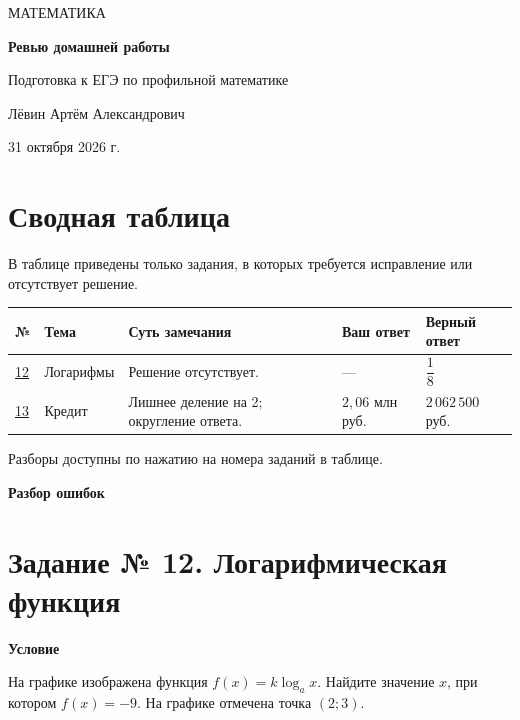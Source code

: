 \documentclass[a4paper,12pt]{article}
\newcommand{\headtxt}[1]{\par\smallskip\textbf{\textcolor{darkaccent}{#1}}\par\vspace{-1mm}}
\begin{document}
\thispagestyle{empty}
\begin{center}
\vspace*{39mm}
{\large\textcolor{darkaccent}{МАТЕМАТИКА}}\par
\vspace{18mm}
{\Huge\bfseries Ревью домашней работы}\par
\vspace{12mm}
{\large Подготовка к ЕГЭ по профильной математике}\par
\vfill
{\large Лёвин Артём Александрович}\par
\vspace{6mm}
{\large 31 октября 2026 г.}\par
\vspace{25mm}
\end{center}
\newpage
\section*{Сводная таблица}
\textcolor{textgray}{В таблице приведены только задания, в которых требуется исправление или отсутствует решение.}\par
\vspace{5mm}
\footnotesize
\setlength{\tabcolsep}{3pt}
\renewcommand{\arraystretch}{1.35}
\begin{tabular}{@{}p{8mm}p{24mm}p{60mm}p{24mm}p{31mm}@{}}
\toprule
\textbf{№} & \textbf{Тема} & \textbf{Суть замечания} & \textbf{Ваш ответ} & \textbf{Верный ответ}\\
\midrule
\hyperref[task:12]{12} & Логарифмы & Решение отсутствует. & --- & $\dfrac18$\\
\hyperref[task:13]{13} & Кредит & Лишнее деление на 2; округление ответа. & $2{,}06$ млн руб. & $2\,062\,500$ руб.\\
\bottomrule
\end{tabular}\par
\normalsize
\vfill
\textcolor{textgray}{Разборы доступны по нажатию на номера заданий в таблице.}
\newpage
\thispagestyle{empty}
\null\vfill
\begin{center}
{\Huge\bfseries\textcolor{darkaccent}{Разбор ошибок}}
\end{center}
\vfill\null
\newpage
{}\label{task:12}
\section*{Задание № 12. Логарифмическая функция}
\headtxt{Условие}
На графике изображена функция $f(x)=k\log_a x$. Найдите значение $x$, при котором $f(x)=-9$. На графике отмечена точка $(2;3)$.
\end{document}
